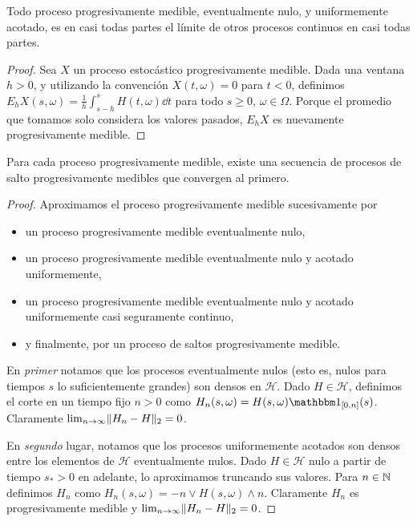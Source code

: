 \begin{lemma}
  Todo proceso progresivamente medible, eventualmente nulo, y uniformemente acotado, es en casi todas partes el límite de otros procesos continuos en casi todas partes. 
\end{lemma}
\begin{proof}
  Sea \(X\) un proceso estocástico progresivamente medible.
  Dada una ventana \(h > 0\), y utilizando la convención \(X(t, \omega) = 0\) para \(t < 0\), definimos \(E_h X (s, \omega) = \frac{1}{h} \int_{s - h}^{s} H(t, \omega) \dd t\) para todo \(s \geq 0\), \(\omega \in \Omega\).
  Porque el promedio que tomamos solo considera los valores pasados, \(E_h X\) es nuevamente progresivamente medible.
  
\end{proof}

\begin{lemma}
  Para cada proceso progresivamente medible, existe una secuencia de procesos de salto progresivamente medibles que convergen al primero.
\end{lemma}
\begin{proof}
  Aproximamos el proceso progresivamente medible sucesivamente por
  \begin{itemize}
    \item un proceso progresivamente medible eventualmente nulo,
    \item un proceso progresivamente medible eventualmente nulo y acotado uniformemente,
    \item  un proceso progresivamente medible eventualmente nulo y acotado uniformemente casi seguramente continuo,
    \item y finalmente, por un proceso de saltos progresivamente medible.
  \end{itemize}
  
  En \emph{primer} notamos que los procesos eventualmente nulos (esto es, nulos para tiempos \(s\) lo suficientemente grandes) son densos en \(\mathcal{H}\).
  Dado \(H \in \mathcal{H}\), definimos el corte en un tiempo fijo \(n > 0\) como \(H_n(s, \omega) = H(s, \omega) \characteristic_{[0, n]}(s)\).
  Claramente \(\lim_{n \rightarrow \infty} \lVert H_n - H\rVert_2 = 0\).

  En \emph{segundo} lugar, notamos que los procesos uniformemente acotados son densos entre los elementos de \(\mathcal{H}\) eventualmente nulos.
  Dado \(H \in \mathcal{H}\) nulo a partir de tiempo \(s_* > 0\) en adelante, lo aproximamos truncando sus valores.
  Para \(n \in \mathbb{N}\) definimos \(H_n\) como \(H_n(s, \omega) = -n \vee H(s, \omega) \wedge n\).
  Claramente \(H_n\) es progresivamente medible y \(\lim_{n \rightarrow \infty} \lVert H_n - H\rVert_2 = 0\).
\end{proof}


